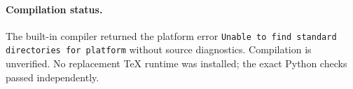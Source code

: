 \documentclass[11pt]{article}
\begin{document}
\paragraph{Compilation status.}
The built-in compiler returned the platform error
\texttt{Unable to find standard directories for platform} without source
diagnostics. Compilation is unverified. No replacement TeX runtime was
installed; the exact Python checks passed independently.
\end{document}
